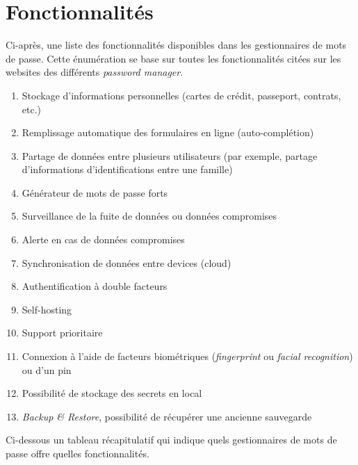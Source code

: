 \section{Fonctionnalités}
Ci-après, une liste des fonctionnalités disponibles dans les gestionnaires de mots de passe. Cette énumération se base sur toutes les fonctionnalités citées sur les websites des différents \textit{password manager}. \\
\begin{enumerate}
\item Stockage d'informations personnelles (cartes de crédit, passeport, contrats, etc.)
\item Remplissage automatique des formulaires en ligne (auto-complétion)
\item Partage de données entre plusieurs utilisateurs (par exemple, partage d'informations d'identifications entre une famille)
\item Générateur de mots de passe forts
\item Surveillance de la fuite de données ou données compromises
\item Alerte en cas de données compromises
\item Synchronisation de données entre devices (cloud)
\item Authentification à double facteurs
\item Self-hosting
\item Support prioritaire
\item Connexion à l'aide de facteurs biométriques (\textit{fingerprint} ou \textit{facial recognition}) ou d'un pin
\item Possibilité de stockage des secrets en local
\item \textit{Backup \& Restore}, possibilité de récupérer une ancienne sauvegarde

\end{enumerate}
Ci-dessous un tableau récapitulatif qui indique quels gestionnaires de mots de passe offre quelles fonctionnalités. 
